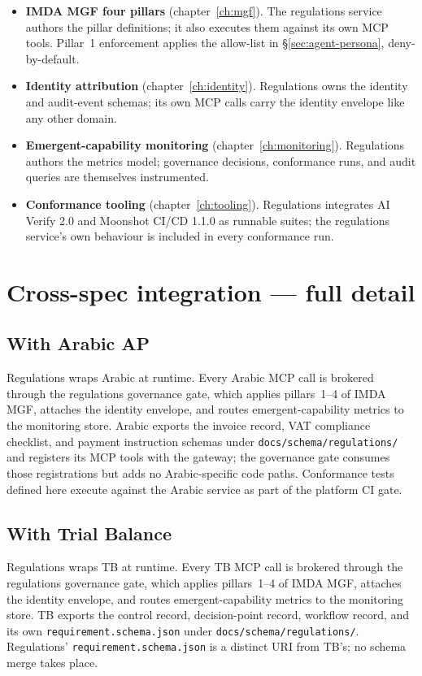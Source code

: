 \begin{itemize}
  \item \textbf{IMDA MGF four pillars} (chapter~\ref{ch:mgf}). The
    regulations service authors the pillar definitions; it also
    executes them against its own MCP tools. Pillar~1 enforcement
    applies the allow-list in \S\ref{sec:agent-persona},
    deny-by-default.
  \item \textbf{Identity attribution} (chapter~\ref{ch:identity}).
    Regulations owns the identity and audit-event schemas; its own
    MCP calls carry the identity envelope like any other domain.
  \item \textbf{Emergent-capability monitoring}
    (chapter~\ref{ch:monitoring}). Regulations authors the metrics
    model; governance decisions, conformance runs, and audit queries
    are themselves instrumented.
  \item \textbf{Conformance tooling} (chapter~\ref{ch:tooling}).
    Regulations integrates AI Verify 2.0 and Moonshot CI/CD 1.1.0
    as runnable suites; the regulations service's own behaviour is
    included in every conformance run.
\end{itemize}

\section{Cross-spec integration --- full detail}
\label{sec:agent-integration}

\subsection{With Arabic AP}
Regulations wraps Arabic at runtime. Every Arabic MCP call is
brokered through the regulations governance gate, which applies
pillars~1--4 of IMDA MGF, attaches the identity envelope, and routes
emergent-capability metrics to the monitoring store. Arabic exports
the invoice record, VAT compliance checklist, and payment
instruction schemas under \texttt{docs/schema/regulations/} and registers
its MCP tools with the gateway; the governance gate consumes those
registrations but adds no Arabic-specific code paths. Conformance
tests defined here execute against the Arabic service as part of
the platform CI gate.

\subsection{With Trial Balance}
Regulations wraps TB at runtime. Every TB MCP call is brokered
through the regulations governance gate, which applies pillars~1--4
of IMDA MGF, attaches the identity envelope, and routes
emergent-capability metrics to the monitoring store. TB exports the
control record, decision-point record, workflow record, and its own
\texttt{requirement.schema.json} under \texttt{docs/schema/regulations/}.
Regulations' \texttt{requirement.schema.json} is a distinct URI
from TB's; no schema merge takes place.

